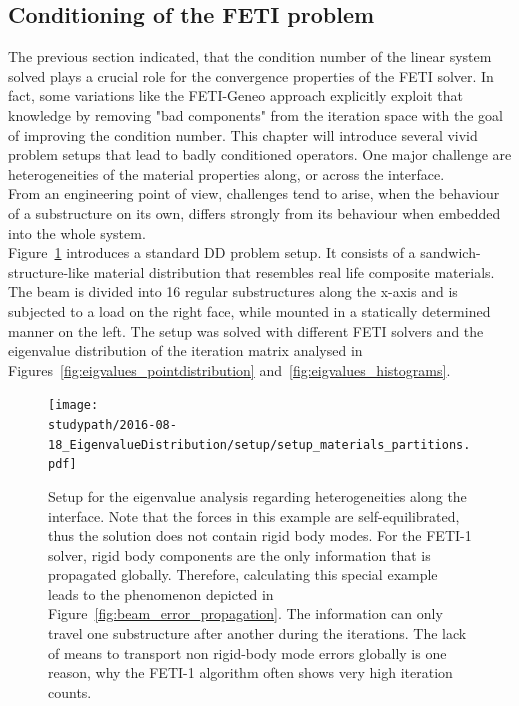 \subsection{Conditioning of the FETI problem}

The previous section indicated, that the condition number of the linear system solved plays a crucial role for the convergence properties of the FETI solver. In fact, some variations like the FETI-Geneo approach explicitly exploit that knowledge by removing "bad components" from the iteration space with the goal of improving the condition number. This chapter will introduce several vivid problem setups that lead to badly conditioned operators. One major challenge are heterogeneities of the material properties along, or across the interface.\\
From an engineering point of view, challenges tend to arise, when the behaviour of a substructure on its own, differs strongly from its behaviour when embedded into the whole system.\\
Figure~\ref{fig:setup_heterogenities_along_interface} introduces a standard DD problem setup. It consists of a sandwich-structure-like material distribution that resembles real life composite materials. The beam is divided into 16 regular substructures along the x-axis and is subjected to a load on the right face, while mounted in a statically determined manner on the left. The setup was solved with different FETI solvers and the eigenvalue distribution of the iteration matrix analysed in Figures~\ref{fig:eigvalues_pointdistribution} and~\ref{fig:eigvalues_histograms}.

\begin{figure}[tb]
  \begin{center}
    \texttt{[image: \\studypath/2016-08-18\_EigenvalueDistribution/setup/setup\_materials\_partitions.pdf]}
    \caption[Study of eigenvalue distribution: setup]{Setup for the eigenvalue analysis regarding heterogeneities along the interface. Note that the forces in this example are self-equilibrated, thus the solution does not contain rigid body modes. For the FETI-1 solver, rigid body components are the only information that is propagated globally. Therefore, calculating this special example leads to the phenomenon depicted in Figure~\ref{fig:beam_error_propagation}. The information can only travel one substructure after another during the iterations. The lack of means to transport non rigid-body mode errors globally is one reason, why the FETI-1 algorithm often shows very high iteration counts.}
    \label{fig:setup_heterogenities_along_interface}
  \end{center}
\end{figure}


